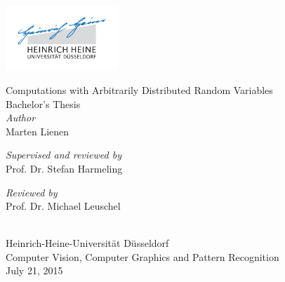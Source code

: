 \documentclass[11pt,a4paper]{book}
\begin{document}
\pagestyle{empty}

\frontmatter


\begin{titlepage}
  \begingroup
  \begin{center}
    \includegraphics[width=120pt]{thesis/logo}\\

    \vspace{9em}

    {\Huge Computations with Arbitrarily Distributed Random Variables}\\
    \vspace{2em}
    {\large Bachelor's Thesis}\\
    \vfill
    \small{\emph{Author}}\\
    \vspace{0.3em}
    {\LARGE Marten Lienen}\\
    \vspace{6em}
    \begin{minipage}{0.4\textwidth}
      \begin{flushleft}
        \small{\emph{Supervised and reviewed by}}\\
        \vspace{0.3em}
        {\large Prof. Dr. Stefan Harmeling}
      \end{flushleft}
    \end{minipage}
    \hfill
    \begin{minipage}{0.4\textwidth}
      \begin{flushright}
        \small{\emph{Reviewed by}}\\
        \vspace{0.3em}
        {\large Prof. Dr. Michael Leuschel}
      \end{flushright}
    \end{minipage}
    \\
    \vspace{4em}
    {\Large Heinrich-Heine-Universität Düsseldorf}\\
    \vspace{0.5em}
    {\large Computer Vision, Computer Graphics and Pattern Recognition}\\
    \vspace{1em}
    July 21, 2015
  \end{center}
  \endgroup
\end{titlepage}
\end{document}
